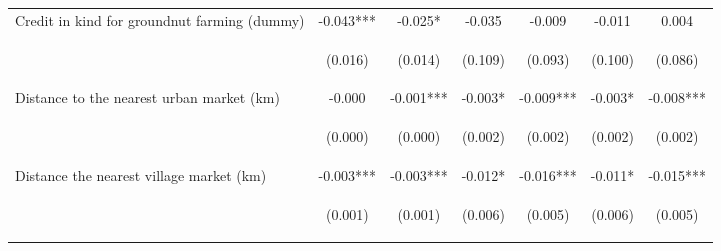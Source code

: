 \begin{center}
\begin{tabular}{lcccccc}
Credit in kind for groundnut farming (dummy) & -0.043*** & -0.025* & -0.035 & -0.009 & -0.011 & 0.004 \\
\vspace{4pt} & \begin{footnotesize}(0.016)\end{footnotesize} & \begin{footnotesize}(0.014)\end{footnotesize} & \begin{footnotesize}(0.109)\end{footnotesize} & \begin{footnotesize}(0.093)\end{footnotesize} & \begin{footnotesize}(0.100)\end{footnotesize} & \begin{footnotesize}(0.086)\end{footnotesize} \\
Distance to the nearest urban market (km) & -0.000 & -0.001*** & -0.003* & -0.009*** & -0.003* & -0.008*** \\
\vspace{4pt} & \begin{footnotesize}(0.000)\end{footnotesize} & \begin{footnotesize}(0.000)\end{footnotesize} & \begin{footnotesize}(0.002)\end{footnotesize} & \begin{footnotesize}(0.002)\end{footnotesize} & \begin{footnotesize}(0.002)\end{footnotesize} & \begin{footnotesize}(0.002)\end{footnotesize} \\
Distance the nearest village market (km) & -0.003*** & -0.003*** & -0.012* & -0.016*** & -0.011* & -0.015*** \\
\vspace{4pt} & \begin{footnotesize}(0.001)\end{footnotesize} & \begin{footnotesize}(0.001)\end{footnotesize} & \begin{footnotesize}(0.006)\end{footnotesize} & \begin{footnotesize}(0.005)\end{footnotesize} & \begin{footnotesize}(0.006)\end{footnotesize} & \begin{footnotesize}(0.005)\end{footnotesize} \\

\end{tabular}
\end{center}
